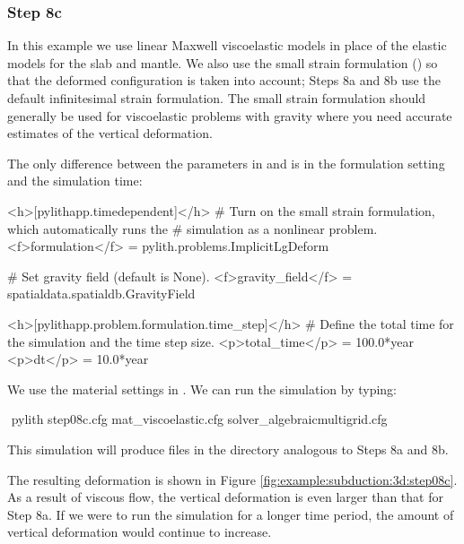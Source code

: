 \subsubsection{Step 8c}

In this example we use linear Maxwell viscoelastic models in place of
the elastic models for the slab and mantle. We also use the small
strain formulation () so that the deformed
configuration is taken into account; Steps 8a and 8b use the default
 infinitesimal strain formulation. The small strain
formulation should generally be used for viscoelastic problems with
gravity where you need accurate estimates of the vertical deformation.


The only difference between the parameters in 
and  is in the formulation setting and the
simulation time:
\begin{cfg}
<h>[pylithapp.timedependent]</h>
# Turn on the small strain formulation, which automatically runs the
# simulation as a nonlinear problem.
<f>formulation</f> = pylith.problems.ImplicitLgDeform

# Set gravity field (default is None).
<f>gravity_field</f> = spatialdata.spatialdb.GravityField

<h>[pylithapp.problem.formulation.time_step]</h>
# Define the total time for the simulation and the time step size.
<p>total_time</p> = 100.0*year
<p>dt</p> = 10.0*year
\end{cfg}
We use the material settings in . We
can run the simulation by typing:
\begin{shell}
$$ pylith step08c.cfg mat_viscoelastic.cfg solver_algebraicmultigrid.cfg
\end{shell}
This simulation will produce files in the  directory
analogous to Steps 8a and 8b.

The resulting deformation is shown in Figure
\ref{fig:example:subduction:3d:step08c}. As a result of viscous flow,
the vertical deformation is even larger than that for Step 8a. If we
were to run the simulation for a longer time period, the amount of
vertical deformation would continue to increase.

